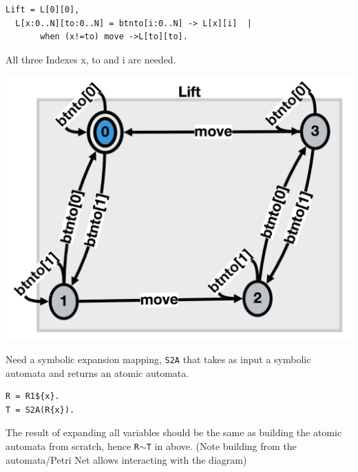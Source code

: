 \documentclass[]{article}
\begin{document}
\vspace{1em} \begin{minipage}{0.55\textwidth}
\begin{verbatim}
Lift = L[0][0],
  L[x:0..N][to:0..N] = btnto[i:0..N] -> L[x][i]  |
       when (x!=to) move ->L[to][to].
  \end{verbatim}

All three Indexes {\sf x}, {\sf to} and {\sf i}  are needed.
\end{minipage}
\begin{minipage}{0.4\textwidth}
\begin{center}\includegraphics[scale=0.12]{Lix.jpg}\end{center}
\end{minipage}



Need a symbolic expansion mapping,  \verb|S2A|  that takes as input a symbolic  automata and returns an atomic automata.




\begin{center}
\begin{minipage}{0.3\textwidth}
\begin{verbatim}
R = R1${x}.
T = S2A(R{x}).
\end{verbatim}
\end{minipage}
\end{center}

The result of expanding all variables should be the same as building the atomic automata from  scratch, hence \verb|R|$\sim$\verb|T| in above. (Note building from the automata/Petri Net allows interacting with the diagram)
\end{document}
